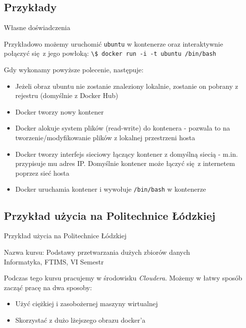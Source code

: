 \documentclass[aspectratio=169]{beamer}
\begin{document}
\subsection{Przykłady}
\begin{frame}{Własne doświadczenia}
    \begin{cardTiny}
        Przykładowo możemy uruchomić \colorbox{dark-gray}{\lstinline{ubuntu}} w kontenerze oraz interaktywnie połączyć się z jego powłoką: \colorbox{dark-gray}{\lstinline{\$ docker run -i -t ubuntu /bin/bash}}
    \end{cardTiny}

    \begin{cardTiny}
        Gdy wykonamy powyższe polecenie, następuje:
        \begin{itemize}
            \item Jeżeli obraz ubuntu nie zostanie znaleziony lokalnie, zostanie on pobrany z rejestru (domyślnie z Docker Hub)
            \item Docker tworzy nowy kontener
            \item Docker alokuje system plików (read-write) do kontenera - pozwala to na tworzenie/modyfikowanie plików z lokalnej przestrzeni hosta
            \item Docker tworzy interfejs sieciowy łączący kontener z domyślną siecią - m.in. przypisuje mu adres IP. Domyślnie kontener może łączyć się z internetem poprzez sieć hosta
            \item Docker uruchamia kontener i wywołuje \colorbox{dark-gray}{\lstinline{/bin/bash}} w kontenerze
        \end{itemize}
    \end{cardTiny}
\end{frame}

\subsection{Przykład użycia na Politechnice Łódzkiej}
\begin{frame}{Przykład użycia na Politechnice Łódzkiej}
    \begin{cardTiny}
        \centering
        Nazwa kursu: Podstawy przetwarzania dużych zbiorów danych\\
        Informatyka, FTIMS, VI Semestr
    \end{cardTiny}
    \begin{cardTiny}
        Podczas tego kursu pracujemy w środowisku \textit{Cloudera}. Możemy w łatwy sposób zacząć pracę na dwa sposoby:
        \begin{itemize}
            \item Użyć ciężkiej i zasobożernej maszyny wirtualnej
            \item Skorzystać z dużo lżejszego obrazu docker'a
        \end{itemize}
    \end{cardTiny}
\end{frame}
\end{document}
